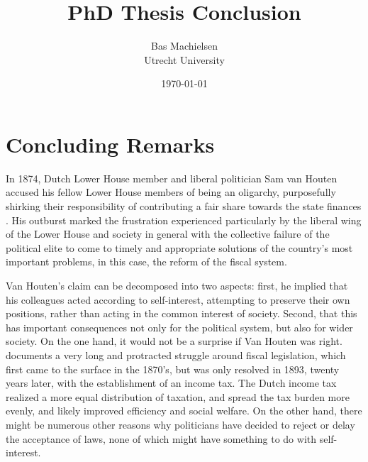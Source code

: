 

\title{\textbf{PhD Thesis Conclusion}}
\author{Bas Machielsen \\ Utrecht University}
\date{\today}



\maketitle

\section{Concluding Remarks}

In 1874, Dutch Lower House member and liberal politician Sam van Houten accused his fellow Lower House members of being an oligarchy, purposefully shirking their responsibility of contributing a fair share towards the state finances \citep{van2013eerste}. His outburst marked the frustration experienced particularly by the liberal wing of the Lower House and society in general with the collective failure of the political elite to come to timely and appropriate solutions of the country's most important problems, in this case, the reform of the fiscal system. 

Van Houten's claim can be decomposed into two aspects: first, he implied that his colleagues acted according to self-interest, attempting to preserve their own positions, rather than acting in the common interest of society. Second, that this has important consequences not only for the political system, but also for wider society. On the one hand, it would not be a surprise if Van Houten was right. \cite{smit2002omwille} documents a very long and protracted struggle around fiscal legislation, which first came to the surface in the 1870's, but was only resolved in 1893, twenty years later, with the establishment of an income tax. The Dutch income tax realized a more equal distribution of taxation, and spread the tax burden more evenly, and likely improved efficiency and social welfare. On the other hand, there might be numerous other reasons why politicians have decided to reject or delay the acceptance of laws, none of which might have something to do with self-interest. 

